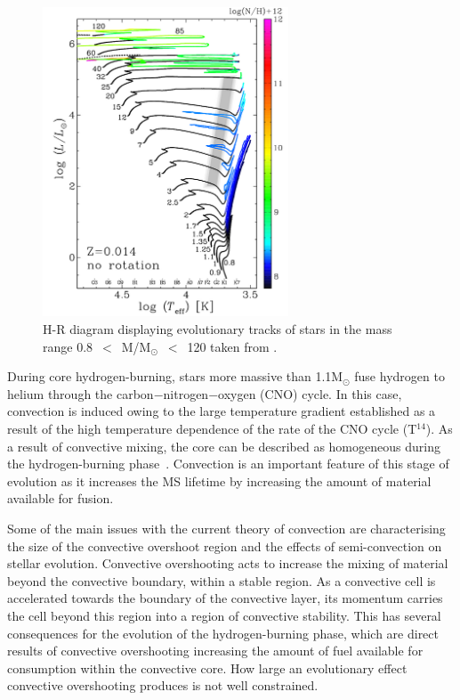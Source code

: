 \begin{figure}
 \centering
 \includegraphics[width=0.65\textwidth]{intro/HRD}
 \caption[HRD]{
H-R diagram displaying evolutionary tracks of stars in the mass range 0.8~$<$~M/M$_{\odot}$~$<$~120 taken from
\protect\citet{2012A&A...537A.146E}.
 \label{fig:HRD}}
\end{figure}


During core hydrogen-burning, stars more massive than 1.1M$_{\odot}$ fuse hydrogen to helium through the carbon$-$nitrogen$-$oxygen (CNO) cycle.
In this case, convection is induced owing to the large temperature gradient established as a result of the high temperature dependence of the rate of the CNO cycle (T$^{14}$).
As a result of convective mixing, the core can be described as homogeneous during the hydrogen-burning phase~\citep{b:KippenhahnWeigert}.
Convection is an important feature of this stage of evolution as it increases the MS lifetime by increasing the amount of material available for fusion.

Some of the main issues with the current theory of convection are characterising the size of the convective overshoot region and the effects of semi-convection on stellar evolution.
Convective overshooting acts to increase the mixing of material beyond the convective boundary, within a stable region.
As a convective cell is accelerated towards the boundary of the convective layer, its momentum carries the cell beyond this region into a region of convective stability.
This has several consequences for the evolution of the hydrogen-burning phase, which are direct results of convective overshooting increasing the amount of fuel available for consumption within the convective core.
How large an evolutionary effect convective overshooting produces is not well constrained.

